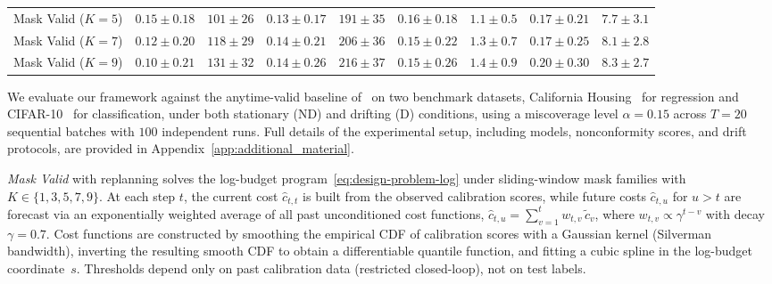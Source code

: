 \documentclass{uai2026} %
\newcommand{\1}{\mathbf{1}}
\begin{document}
\begin{table}[htbp]
\begin{tabular}{@{}l|cc|cc|cc|cc@{}}
    Mask Valid  ($K{=}5$) & $0.15{\pm}0.18$               & $101{\pm}26$ & $0.13{\pm}0.17$ & $191{\pm}35$ & $0.16{\pm}0.18$ & $1.1{\pm}0.5$ & $0.17{\pm}0.21$ & $7.7{\pm}3.1$ \\
    Mask Valid  ($K{=}7$) & $0.12{\pm}0.20$               & $118{\pm}29$ & $0.14{\pm}0.21$ & $206{\pm}36$ & $0.15{\pm}0.22$ & $1.3{\pm}0.7$ & $0.17{\pm}0.25$ & $8.1{\pm}2.8$ \\
    Mask Valid  ($K{=}9$) & $0.10{\pm}0.21$               & $131{\pm}32$ & $0.14{\pm}0.26$ & $216{\pm}37$ & $0.15{\pm}0.26$ & $1.4{\pm}0.9$ & $0.20{\pm}0.30$ & $8.3{\pm}2.7$ \\
    \bottomrule
  \end{tabular}
\end{table}

We evaluate our framework against the anytime-valid baseline of~\citet{gauthier2025values} on two benchmark datasets, California Housing~\citep{california_housing} for regression and CIFAR-10~\citep{cifar10} for classification, under both stationary (ND) and drifting  (D) conditions, using a miscoverage level $\alpha = 0.15$ across $T = 20$ sequential batches with $100$ independent runs.
Full details of the experimental setup, including models, nonconformity scores, and drift protocols, are provided in Appendix~\ref{app:additional_material}.
\label{sec:exp-setup}

\emph{Mask Valid} with replanning solves the log-budget program~\eqref{eq:design-problem-log} under sliding-window mask families with $K \in \{1, 3, 5, 7, 9\}$.
At each step $t$, the current cost $\hat{c}_{t,t}$ is built from the observed calibration scores, while future costs $\hat{c}_{t,u}$ for $u > t$ are forecast via an exponentially weighted average of all past unconditioned cost functions, $\hat{c}_{t,u} = \sum_{v=1}^{t} w_{t,v}\, \tilde{c}_v$, where $w_{t,v} \propto \gamma^{t-v}$ with decay $\gamma = 0.7$.
Cost functions are constructed by smoothing the empirical CDF of calibration
scores with a Gaussian kernel (Silverman bandwidth), inverting the resulting
smooth CDF to obtain a differentiable quantile function, and fitting a cubic
spline in the log-budget coordinate~$s$.
Thresholds depend only on past calibration data (restricted closed-loop), not on test labels.
\end{document}
